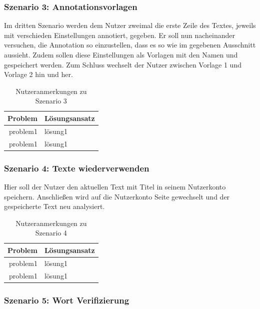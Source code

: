 \subsubsection{Szenario 3: Annotationsvorlagen}

Im dritten Szenario werden dem Nutzer zweimal die erste Zeile des Textes, jeweils mit verschieden Einstellungen annotiert, gegeben. Er soll nun nacheinander versuchen, die Annotation so einzustellen, dass es so wie im gegebenen Ausschnitt aussieht. Zudem sollen diese Einstellungen als Vorlagen mit den Namen  und  gespeichert werden. Zum Schluss wechselt der Nutzer zwischen Vorlage 1 und Vorlage 2 hin und her.

\begin{table}[h!]
	\centering
	\begin{tabular}{|r|l|}
		\hline
		\textbf{Problem} & \textbf{Lösungsansatz}\\
		\hline
		\hline
		problem1 & lösung1\\
		\hline
		problem1 & lösung1\\
		\hline
	\end{tabular}
	\caption{Nutzeranmerkungen zu Szenario 3}
	\label{table:szenario3}
\end{table}

\subsubsection{Szenario 4: Texte wiederverwenden}

Hier soll der Nutzer den aktuellen Text mit Titel in seinem Nutzerkonto speichern. Anschließen wird auf die Nutzerkonto Seite gewechselt und der gespeicherte Text neu analysiert.

\begin{table}[h!]
	\centering
	\begin{tabular}{|r|l|}
		\hline
		\textbf{Problem} & \textbf{Lösungsansatz}\\
		\hline
		\hline
		problem1 & lösung1\\
		\hline
		problem1 & lösung1\\
		\hline
	\end{tabular}
	\caption{Nutzeranmerkungen zu Szenario 4}
	\label{table:szenario4}
\end{table}

\subsubsection{Szenario 5: Wort Verifizierung}


